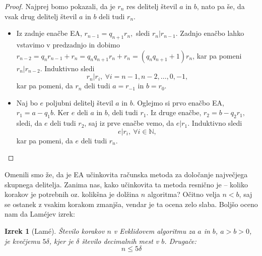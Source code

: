 \documentclass[12pt, a4paper]{article}
\newtheorem{izr}{Izrek}
\begin{document}
\begin{proof}
Najprej bomo pokazali, da je $r_n$ res delitelj števil $a$ in $b$, nato pa še, da vsak drug delitelj števil $a$ in $b$ deli tudi $r_n$.
\begin{itemize}
\item Iz zadnje enačbe EA, $r_{n-1} = q_{n+1}r_n,$ sledi $r_n|r_{n-1}$. Zadnjo enačbo lahko vstavimo v predzadnjo in dobimo
$r_{n-2} = q_n r_{n-1} + r_n = q_n q_{n+1}r_n + r_n= (q_n q_{n+1}+1)r_n$, kar pa pomeni $r_n | r_{n-2}$. Induktivno sledi
$$r_n | r_i,\ \forall i=n-1,n-2,\dots,0,-1,$$
kar pa pomeni, da $r_n$ deli tudi $a=r_{-1}$ in $b=r_0$.
\item Naj bo $e$ poljubni delitelj števil $a$ in $b$. Oglejmo si prvo enačbo EA, $r_1 = a - q_1 b$. Ker $e$ deli $a$ in $b$, deli tudi $r_1$. Iz druge enačbe, $r_2 = b - q_2 r_1,$ sledi, da $e$ deli tudi $r_2$, saj iz prve enačbe vemo, da $e|r_1$. Induktivno sledi
$$e|r_i,\ \forall i\in \mathbb{N},$$
kar pa pomeni, da $e$ deli tudi $r_n$.
\end{itemize}
\end{proof}

Omenili smo že, da je EA učinkovita računska metoda za določanje največjega skupnega delitelja. Zanima nas, kako učinkovita ta metoda resnično je --  koliko korakov je potrebnih oz. kolikšna je dolžina $n$ algoritma? Očitno velja $n<b$, saj se ostanek z vsakim korakom zmanjša, vendar je ta ocena zelo slaba. Boljšo oceno nam da Lam\'ejev izrek:

\begin{izr}[Lam\'e]
Število korakov $n$ v Evklidovem algoritmu za $a$ in $b$, \mbox{$a>b>0$}, je kvečjemu $5\delta$, kjer je $\delta$ število decimalnih mest v $b$. Drugače: $$n\leq 5\delta$$
\end{izr}
\end{document}
